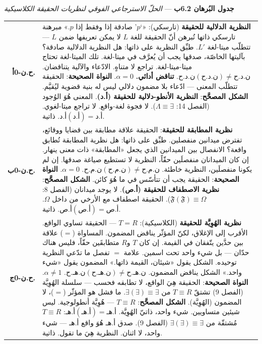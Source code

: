 \documentclass[10pt, openany, oneside]{book}
\renewcommand{\footnotesize}{\fontsize{8.5}{11}\selectfont}
\begin{document}
\textbf{جدول البُرهان 6.2ب} --- \textit{الحلّ الاسترجاعي الفوقي لنظريات الحقيقة الكلاسيكية}

\vspace{0.5em}

{\footnotesize
\noindent\begin{tabular}{r p{}}
\textbf{ح.ن-0أ.} & \textbf{النظرية الدلالية للحقيقة} (تارسكي): «`$p$' صادقة إذا وفقط إذا $p$.» مبرهنة تارسكي ذاتها تُبرهن أنّ الحقيقة للغة $L$ لا يمكن تعريفها ضمن $L$ --- تتطلّب ميتا-لغة $L'$. طبِّق النظرية على ذاتها: هل النظرية الدلالية صادقة؟ بآليتها الخاصّة، صدقها يجب أن يُعرَّف في ميتا-لغة. تلك الميتا-لغة تحتاج ميتا-ميتا-لغة. تراجع لا متناهٍ. الادّعاء والآلية يتناقضان. $\text{ن.د.ح}(\text{ن.د.ح}) \neq \text{ن.د.ح}$. \textbf{تناقض أدائي.} $\alpha = 0$. \textbf{النواة الصحيحة}: الحقيقة تتطلّب المعنى --- ادّعاء بلا مضمون دلالي ليس له بنية قضوية ليُقيَّم. \textbf{الشكل المصحَّح}: \textbf{النظرية الأنطو-دلالية للحقيقة (أ.د)}. المعنى هُوَ الوُجود (الفصل 14: $\Lambda \equiv \exists$). لا فجوة لغة-واقع. لا تراجع ميتا-لغوي. $\text{أ.د}(\text{أ.د}) = \text{أ.د}$. ذاتية. \\[0.5em]
\textbf{ح.ن-0ب.} & \textbf{نظرية المطابقة للحقيقة}: الحقيقة علاقة مطابقة بين قضايا ووقائع، تفترض ميدانين منفصلين. طبِّق على ذاتها: هل نظرية المطابقة تُطابق واقعة؟ الانفصال بين الميدانين الذي يجعل «المطابقة» ذات معنى ينهار. إن كان الميدانان منفصلَين حقّاً، النظرية لا تستطيع صياغة صدقها. إن لم يكونا منفصلَين، النظرية خاطئة. $\text{ن.م.ح}(\text{ن.م.ح}) \neq \text{ن.م.ح}$. $\alpha = 0$. \textbf{النواة الصحيحة}: الحقيقة يجب أن تتأسّس في ما هُوَ كائن. \textbf{الشكل المصحَّح}: \textbf{نظرية الاصطفاف للحقيقة (أ.ص)}. لا يوجد ميدانان (الفصل 8: $\mathfrak{F}(\mathfrak{F}) \equiv \Omega$). الحقيقة اصطفاف مع الأرخي من داخل $\Omega$. $\text{أ.ص}(\text{أ.ص}) = \text{أ.ص}$. ذاتية. \\[0.5em]
\textbf{ح.ن-0ج.} & \textbf{نظرية الهُوِيَّة للحقيقة} (الكلاسيكية): $T = R$ --- الحقيقة تساوي الواقع. الأقرب إلى الإغلاق، لكنّ المؤثّر يناقض المضمون. المساواة ($=$) علاقة بين حدَّين يتّفقان في القيمة. إن كان $T$ و$R$ متطابقَين حقّاً، فليس هناك حدّان --- بل شيء واحد تحت اسمين. علامة $=$ تفصل ما تدّعي النظرية توحيده. الشكل يقول «شيئان، القيمة ذاتها.» المضمون يقول «شيء واحد.» الشكل يناقض المضمون. $\text{ن.هـ.ح}(\text{ن.هـ.ح}) \neq \text{ن.هـ.ح}$. $\alpha \neq 1$. \textbf{النواة الصحيحة}: الحقيقة هِيَ الواقع، لا تطابقه فحسب --- سلسلة الهُوِيَّة (الفصل 9) تشتقّ $T \equiv R$ من $\exists(\exists) \equiv \exists$. ما فشل هو المؤثّر ($=$)، لا المضمون (الهُوِيَّة). \textbf{الشكل المصحَّح}: $T \equiv R$ --- هُوِيَّة أنطولوجية. ليس شيئين متساويين. شيء واحد، ذاتيّ الهُوِيَّة. $\text{أ.هـ}(\text{أ.هـ}) = \text{أ.هـ}$: $T \equiv R$ مُشتقّة من $\exists(\exists) \equiv \exists$ (الفصل 9). صدق أ.هـ هُوَ واقع أ.هـ --- شيء واحد، لا اثنان. النظرية هِيَ ما تقول. ذاتية. \\[0.3em]
\end{tabular}
}
\end{document}

